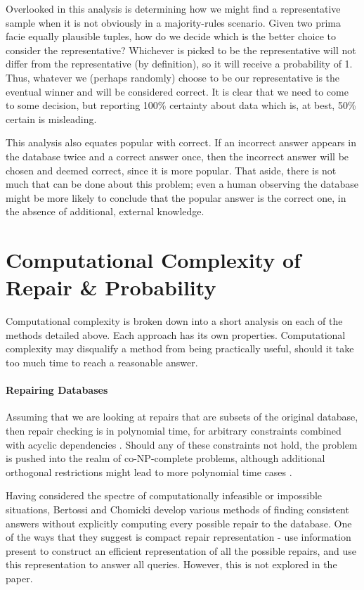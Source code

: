 Overlooked in this analysis is determining how we might find a representative sample when it is not obviously in a majority-rules scenario. Given two prima facie equally plausible tuples, how do we decide which is the better choice to consider the representative? Whichever is picked to be the representative will not differ from the representative (by definition), so it will receive a probability of 1. Thus, whatever we (perhaps randomly) choose to be our representative is the eventual winner and will be considered correct. It is clear that we need to come to some decision, but reporting 100\% certainty about data which is, at best, 50\% certain is misleading. 

This analysis also equates popular with correct. If an incorrect answer appears in the database twice and a correct answer once, then the incorrect answer will be chosen and deemed correct, since it is more popular. That aside, there is not much that can be done about this problem; even a human observing the database might be more likely to conclude that the popular answer is the correct one, in the absence of additional, external knowledge.

\section*{Computational Complexity of Repair \& Probability}
Computational complexity is broken down into a short analysis on each of the methods detailed above. Each approach has its own properties. Computational complexity may disqualify a method from being practically useful, should it take too much time to reach a reasonable answer.

\paragraph{Repairing Databases}
Assuming that we are looking at repairs that are subsets of the original database, then repair checking is in polynomial time, for arbitrary constraints combined with acyclic dependencies \cite{CQ}. Should any of these constraints not hold, the problem is pushed into the realm of co-NP-complete problems, although additional orthogonal restrictions might lead to more polynomial time cases \cite{CQ}.

Having considered the spectre of computationally infeasible or impossible situations, Bertossi and Chomicki \cite{CQ} develop various methods of finding consistent answers without explicitly computing every possible repair to the database. One of the ways that they suggest is compact repair representation - use information present to construct an efficient representation of all the possible repairs, and use this representation to answer all queries. However, this is not explored in the paper.


